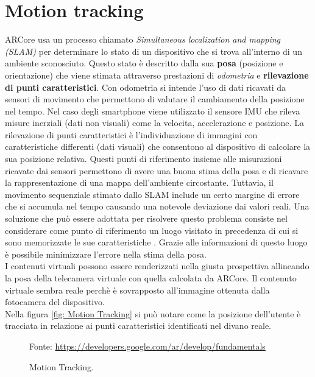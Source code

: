 \documentclass[crop=false, class=book]{standalone}
\begin{document}
	\section{Motion tracking}
	
		ARCore usa un processo chiamato \emph{Simultaneous localization and mapping (SLAM)} per determinare lo stato di un
		dispositivo che si trova all'interno di un ambiente sconosciuto. Questo stato è descritto dalla sua \textbf{posa} (posizione e orientazione) che viene stimata attraverso prestazioni di \emph{odometria} e \textbf{rilevazione di punti caratteristici}. Con odometria si intende l'uso di dati ricavati da sensori di movimento che permettono di valutare il cambiamento della posizione nel tempo. Nel caso degli smartphone viene utilizzato il sensore IMU che rileva misure inerziali (dati non visuali) come la velocita, accelerazione e posizione. La rilevazione di punti caratteristici è l'individuazione di immagini con caratteristiche differenti (dati visuali) che	consentono al dispositivo di calcolare la sua posizione relativa. Questi punti di riferimento insieme alle misurazioni ricavate dai sensori permettono di avere una buona stima della posa e di ricavare la rappresentazione di una mappa dell'ambiente circostante. Tuttavia, il movimento sequenziale stimato dallo SLAM include un certo margine di errore che si accumula nel tempo causando una notevole deviazione dai valori reali. Una soluzione che può essere adottata per risolvere questo problema consiste nel considerare come punto di riferimento un luogo visitato in precedenza di cui si sono memorizzate le sue caratteristiche \cite{mathworks2022slam}. Grazie alle informazioni di questo luogo è possibile minimizzare l'errore nella stima della posa.\\
		I contenuti virtuali possono essere renderizzati nella giusta prospettiva allineando la posa della telecamera virtuale con quella calcolata da ARCore. Il contenuto virtuale sembra reale perchè è sovrapposto all'immagine ottenuta dalla fotocamera del dispositivo.\\
		Nella figura \vref{fig: Motion Tracking} si può notare come la posizione dell'utente è tracciata in relazione ai punti caratteristici identificati nel divano reale.
		
		\begin{figure}
			\centering
			{Fonte: \url{https://developers.google.com/ar/develop/fundamentals}}
			\caption{Motion Tracking.}
			\label{fig: Motion Tracking}
		\end{figure}
		
\end{document}
